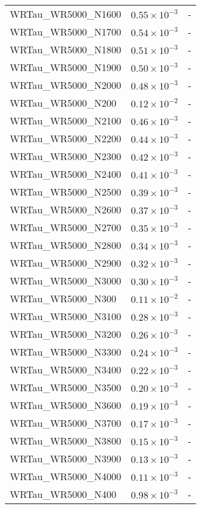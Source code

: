 \begin{longtable}[c]{| C{.35\textwidth} | C{.15\textwidth} | C{.1\textwidth}|}
    WRTau\_WR5000\_N1600 & $0.55\times10^{-3}$ & - \\
    WRTau\_WR5000\_N1700 & $0.54\times10^{-3}$ & - \\
    WRTau\_WR5000\_N1800 & $0.51\times10^{-3}$ & - \\
    WRTau\_WR5000\_N1900 & $0.50\times10^{-3}$ & - \\
    WRTau\_WR5000\_N2000 & $0.48\times10^{-3}$ & - \\
    WRTau\_WR5000\_N200 & $0.12\times10^{-2}$ & - \\
    WRTau\_WR5000\_N2100 & $0.46\times10^{-3}$ & - \\
    WRTau\_WR5000\_N2200 & $0.44\times10^{-3}$ & - \\
    WRTau\_WR5000\_N2300 & $0.42\times10^{-3}$ & - \\
    WRTau\_WR5000\_N2400 & $0.41\times10^{-3}$ & - \\
    WRTau\_WR5000\_N2500 & $0.39\times10^{-3}$ & - \\
    WRTau\_WR5000\_N2600 & $0.37\times10^{-3}$ & - \\
    WRTau\_WR5000\_N2700 & $0.35\times10^{-3}$ & - \\
    WRTau\_WR5000\_N2800 & $0.34\times10^{-3}$ & - \\
    WRTau\_WR5000\_N2900 & $0.32\times10^{-3}$ & - \\
    WRTau\_WR5000\_N3000 & $0.30\times10^{-3}$ & - \\
    WRTau\_WR5000\_N300 & $0.11\times10^{-2}$ & - \\
    WRTau\_WR5000\_N3100 & $0.28\times10^{-3}$ & - \\
    WRTau\_WR5000\_N3200 & $0.26\times10^{-3}$ & - \\
    WRTau\_WR5000\_N3300 & $0.24\times10^{-3}$ & - \\
    WRTau\_WR5000\_N3400 & $0.22\times10^{-3}$ & - \\
    WRTau\_WR5000\_N3500 & $0.20\times10^{-3}$ & - \\
    WRTau\_WR5000\_N3600 & $0.19\times10^{-3}$ & - \\
    WRTau\_WR5000\_N3700 & $0.17\times10^{-3}$ & - \\
    WRTau\_WR5000\_N3800 & $0.15\times10^{-3}$ & - \\
    WRTau\_WR5000\_N3900 & $0.13\times10^{-3}$ & - \\
    WRTau\_WR5000\_N4000 & $0.11\times10^{-3}$ & - \\
    WRTau\_WR5000\_N400 & $0.98\times10^{-3}$ & - \\

\end{longtable}
